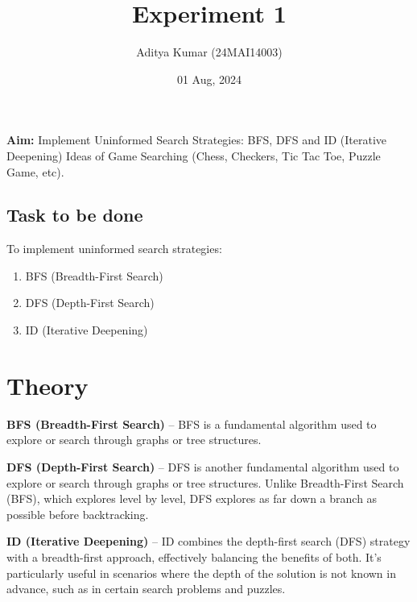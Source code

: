 \documentclass[12pt]{fphw}
\title{Experiment 1}
\author{Aditya Kumar (24MAI14003)\\}
\date{01 Aug, 2024}
\institute{Chandigarh University\\Master of Engineeing---Artificial Intelligence}
\begin{document}
\maketitle

\section*{}
\begin{problem}
  \textbf{Aim: }Implement Uninformed Search Strategies: BFS, DFS and ID (Iterative Deepening) Ideas of Game Searching (Chess, Checkers, Tic Tac Toe, Puzzle Game, etc). 
\end{problem}
\begin{flushleft}
\section{Task to be done}
\end{flushleft}
To implement uninformed search strategies:
\begin{enumerate}
  \item BFS (Breadth-First Search)
  \item DFS (Depth-First Search)
  \item ID (Iterative Deepening)
\end{enumerate}

\section{Theory}
\textbf{BFS (Breadth-First Search)} – BFS is a fundamental algorithm used to explore or search through graphs or tree structures.

\textbf{DFS (Depth-First Search)} – DFS is another fundamental algorithm used to explore or search through graphs or tree structures. Unlike Breadth-First Search (BFS), which explores level by level, DFS explores as far down a branch as possible before backtracking.

\textbf{ID (Iterative Deepening)} – ID combines the depth-first search (DFS) strategy with a breadth-first approach, effectively balancing the benefits of both. It's particularly useful in scenarios where the depth of the solution is not known in advance, such as in certain search problems and puzzles.
\end{document}
